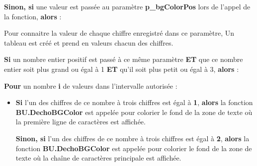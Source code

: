 \documentclass[a4paper,10pt]{article}
\begin{document}
\setlength{\parskip}{1em}

\begin{justify}
    \textbf{\color{cond}Sinon, si} une valeur est passée au paramètre \textbf{\color{vars}p\_bgColorPos} lors de l'appel de la fonction, \textbf{\color{cond}alors} :
\end{justify}

\begin{itemize}
    \item
    {
        \begin{justify}
            Pour connaitre la valeur de chaque chiffre enregistré dans ce paramètre, Un tableau est créé et prend en valeurs chacun des chiffres.
        \end{justify}

        \begin{justify}
            \textbf{\color{cond}Si} un nombre entier positif est passé à ce même paramètre \textbf{ET} que ce nombre entier soit plus grand ou égal à 1 \textbf{ET} qu'il soit plus petit ou égal à 3, \textbf{\color{cond}alors} :
        \end{justify}

        \begin{justify}
            \item
            {
                \begin{justify}
                    \textbf{\color{loop}Pour} un nombre \textbf{\color{vars}i} de valeurs dans l'intervalle autorisée :
                \end{justify}

                \setlength{\parskip}{1em}

                \begin{itemize}
                    \item
                    {
                        \begin{justify}
                            \textbf{\color{cond}Si} l'un des chiffres de ce nombre à trois chiffres est égal à \textbf{1}, \textbf{\color{cond}alors} la fonction \textbf{\color{func}BU.DechoBGColor} est appelée pour colorier le fond de la zone de texte où la première ligne de caractères est affichée.
                        \end{justify}\setlength{\parskip}{1em}

                        \begin{justify}
                            \textbf{\color{cond}Sinon, si} l'un des chiffres de ce nombre à trois chiffres est égal à \textbf{2}, \textbf{\color{cond}alors} la fonction \textbf{\color{func}BU.DechoBGColor} est appelée pour colorier le fond de la zone de texte où la chaîne de caractères principale est affichée.
                        \end{justify}\setlength{\parskip}{1em}

}
\end{itemize}}
\end{justify}}
\end{itemize}
\end{document}
